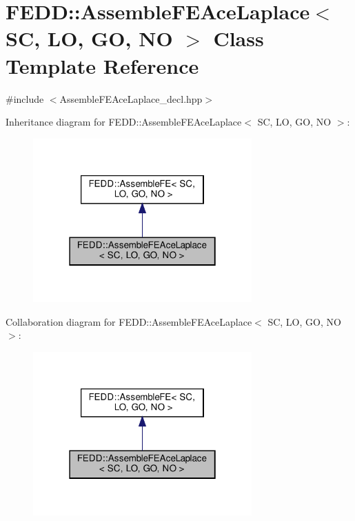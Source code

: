 \hypertarget{classFEDD_1_1AssembleFEAceLaplace}{}\section{F\+E\+DD\+:\+:Assemble\+F\+E\+Ace\+Laplace$<$ SC, LO, GO, NO $>$ Class Template Reference}
\label{classFEDD_1_1AssembleFEAceLaplace}


{\ttfamily \#include $<$Assemble\+F\+E\+Ace\+Laplace\+\_\+decl.\+hpp$>$}



Inheritance diagram for F\+E\+DD\+:\+:Assemble\+F\+E\+Ace\+Laplace$<$ SC, LO, GO, NO $>$\+:\nopagebreak
\begin{figure}[H]
\begin{center}
\leavevmode
\includegraphics[width=238pt]{classFEDD_1_1AssembleFEAceLaplace__inherit__graph}
\end{center}
\end{figure}


Collaboration diagram for F\+E\+DD\+:\+:Assemble\+F\+E\+Ace\+Laplace$<$ SC, LO, GO, NO $>$\+:\nopagebreak
\begin{figure}[H]
\begin{center}
\leavevmode
\includegraphics[width=238pt]{classFEDD_1_1AssembleFEAceLaplace__coll__graph}
\end{center}
\end{figure}
